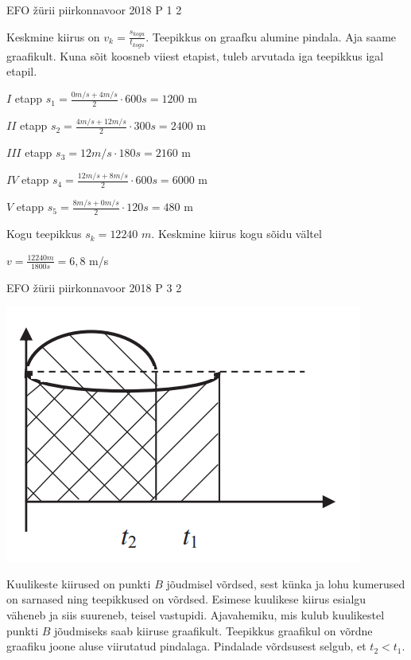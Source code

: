 \documentclass[11pt]{article}
\begin{document}
{%
{EFO žürii} %
{piirkonnavoor} %
{2018} %
{P 1} %
{2} %
{

\ifSolution
Keskmine kiirus on $v_k = \frac{s_{kogu}}{t_{kogu}}$.
Teepikkus on graafku alumine pindala.
Aja saame graafikult. Kuna sõit koosneb viiest etapist, tuleb arvutada iga teepikkus igal etapil.
\begin{center}
$I$ etapp $s_1 = \frac{0 m/s + 4 m/s}{2} \cdot 600s = 1200$ m
\end{center}
\begin{center}
$II$ etapp $s_2 = \frac{4 m/s + 12 m/s}{2} \cdot 300s = 2400$ m
\end{center}
\begin{center}
$III$ etapp $s_3 = 12 m/s \cdot 180s = 2160$ m
\end{center}
\begin{center}
$IV$ etapp $s_4 = \frac{12 m/s + 8 m/s}{2} \cdot 600s = 6000$ m
\end{center}
\begin{center}
$V$ etapp $s_5 = \frac{8 m/s + 0 m/s}{2} \cdot 120s = 480$ m
\end{center}
Kogu teepikkus $s_k = 12 240$ $m$. Keskmine kiirus kogu sõidu vältel
\begin{center}
$v = \frac{12 240 m}{1800s} = 6,8$ m/s
\end{center}
\fi
}


{EFO žürii} %
{piirkonnavoor} %
{2018} %
{P 3} %
{2} %
{

\ifSolution
\begin{center}
	\includegraphics[width=0.5\linewidth]{2018-v2p-03-lah.PNG}
\end{center}
Kuulikeste kiirused on punkti $B$ jõudmisel võrdsed, sest künka ja lohu kumerused on sarnased ning teepikkused on võrdsed. Esimese kuulikese kiirus esialgu väheneb ja siis suureneb, teisel vastupidi. Ajavahemiku, mis kulub kuulikestel punkti $B$ jõudmiseks saab kiiruse graafikult. Teepikkus graafikul on võrdne graafiku joone aluse viirutatud pindalaga. Pindalade võrdsusest selgub, et $t_2 < t_1$.
\fi
}


}
\end{document}

